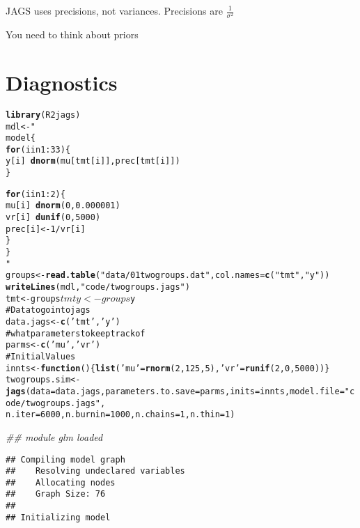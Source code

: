 \documentclass[12pt,letterpaper,oneside]{article}\usepackage{graphicx, color}
\makeatletter
\newcommand{\hlfunctioncall}[1]{\textcolor[rgb]{0.501960784313725,0,0.329411764705882}{\textbf{#1}}}%
\newcommand{\hlstring}[1]{\textcolor[rgb]{0.6,0.6,1}{#1}}%
\newcommand{\hlcomment}[1]{\textcolor[rgb]{0.180392156862745,0.6,0.341176470588235}{#1}}%
\newenvironment{kframe}{%
 \def\at@end@of@kframe{}%
 \ifinner\ifhmode%
  \def\at@end@of@kframe{\end{minipage}}%
  \begin{minipage}{\columnwidth}%
 \fi\fi%
 \def\FrameCommand##1{\hskip\@totalleftmargin \hskip-\fboxsep
 \colorbox{shadecolor}{##1}\hskip-\fboxsep
     \hskip-\linewidth \hskip-\@totalleftmargin \hskip\columnwidth}%
 \MakeFramed {\advance\hsize-\width
   \@totalleftmargin\z@ \linewidth\hsize
   \@setminipage}}%
 {\par\unskip\endMakeFramed%
 \at@end@of@kframe}
\newenvironment{knitrout}{}{} %
\newcommand{\dateTaken}{January 7, 2013}
\makeatother
\begin{document}
JAGS uses precisions, not variances. Precisions are $\frac{1}{\sigma^2}$




\renewcommand{\dateTaken}{January 17, 2013}
\daysep

You need to think about priors

\section{Diagnostics} %
\label{sec:diagnostics}
\begin{knitrout}\scriptsize
{}\color{fgcolor}\begin{kframe}
\begin{alltt}
\hlfunctioncall{library}(R2jags)
mdl <- "
    model \{
        \hlfunctioncall{for} (i in 1:33) \{
            y[i] ~ \hlfunctioncall{dnorm}(mu[tmt[i]], prec[tmt[i]])
        \}

        \hlfunctioncall{for} (i in 1:2) \{
            mu[i] ~ \hlfunctioncall{dnorm}(0,0.000001)
            vr[i] ~ \hlfunctioncall{dunif}(0,5000)
            prec[i] <- 1/vr[i]
        \}
    \}
"
groups <- \hlfunctioncall{read.table}(\hlstring{"data/01twogroups.dat"}, col.names=\hlfunctioncall{c}(\hlstring{"tmt"}, \hlstring{"y"}))
\hlfunctioncall{writeLines}(mdl, \hlstring{"code/twogroups.jags"})
tmt <- groups$tmt
y <- groups$y
\hlcomment{# Data to go into jags}
data.jags <- \hlfunctioncall{c}(\hlstring{'tmt'},\hlstring{'y'})
\hlcomment{# what parameters to keep track of}
parms <- \hlfunctioncall{c}(\hlstring{'mu'},\hlstring{'vr'})
\hlcomment{# Initial Values}
innts <- \hlfunctioncall{function}() \{\hlfunctioncall{list}(\hlstring{'mu'} = \hlfunctioncall{rnorm}(2,125,5), \hlstring{'vr'} = \hlfunctioncall{runif}(2,0,5000))\}
twogroups.sim <- \hlfunctioncall{jags}(data=data.jags, parameters.to.save=parms, inits=innts, model.file=\hlstring{"code/twogroups.jags"},
    n.iter=6000, n.burnin=1000, n.chains=1, n.thin=1)
\end{alltt}


{\ttfamily\noindent\itshape\textcolor{messagecolor}{\#\# module glm loaded}}\begin{verbatim}
## Compiling model graph
##    Resolving undeclared variables
##    Allocating nodes
##    Graph Size: 76
## 
## Initializing model
\end{verbatim}
\begin{alltt}


\end{alltt}
\end{kframe}
\end{knitrout}
\end{document}

